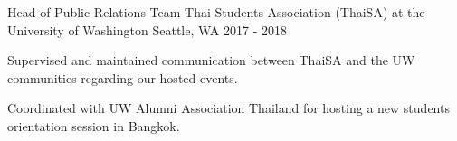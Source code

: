 

\begin{cventries}

  \cventry
    {Head of Public Relations Team} %
    {Thai Students Association (ThaiSA) at the University of Washington} %
    {Seattle, WA} %
    {2017 - 2018} %
    {
      \begin{cvitems} %
        \item {Supervised and maintained communication between ThaiSA and the UW communities regarding our hosted events.}
        \item {Coordinated with UW Alumni Association Thailand for hosting a new students orientation session in Bangkok.}
      \end{cvitems}
    }

\end{cventries}
